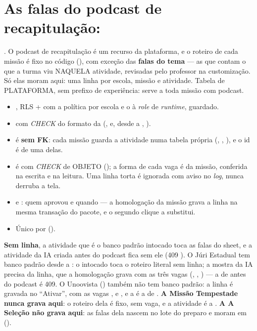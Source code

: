 \section{As falas do podcast de recapitulação: }
\label{sec:podcast-dados}

. O podcast de recapitulação é um recurso da plataforma, e o
roteiro de cada missão é fixo no código (), com
exceção das \textbf{falas do tema} --- as que contam o que a turma viu NAQUELA
atividade, revisadas pelo professor na customização. Só elas moram aqui: uma
linha por escola, missão e atividade. Tabela de PLATAFORMA, sem prefixo de
experiência: serve a toda missão com podcast.

\begin{itemize}
  \item {}, RLS  +  com a política
    por escola e o  à \emph{role} de \emph{runtime}, guardado.
  \item {} com \emph{CHECK} do formato da 
    (,  e, desde a , ).
  \item {} é  \textbf{sem FK}: cada missão guarda a
    atividade numa tabela própria (,
    , ), e o id é de uma delas.
  \item {} é  com \emph{CHECK} de OBJETO
    (); a forma de cada vaga é da missão, conferida na
    escrita e na leitura. Uma linha torta é ignorada com aviso no \emph{log},
    nunca derruba a tela.
  \item {} e : quem aprovou e quando --- a
    homologação da missão grava a linha na mesma transação do pacote, e o
    segundo clique a substitui.
  \item Único por 
    ().
\end{itemize}

\textbf{Sem linha}, a atividade que é o banco padrão intocado toca as falas do
sheet, e a atividade da IA criada antes do podcast fica sem ele (409
). O Júri Estadual tem banco padrão desde a : o intocado toca o
roteiro literal sem linha; a mostra da IA precisa da linha, que a homologação
grava com as três vagas (, , ) --- a de antes do
podcast é 409.
O Unoovista () também não tem banco padrão: a linha é gravada no
\enquote{Ativar}, com as vagas ,  e , e a
 é a de . \textbf{A Missão
Tempestade nunca grava aqui}: o roteiro dela é fixo, sem vaga, e a atividade é a
. \textbf{A A Seleção não grava aqui}: as falas dela
nascem no lote do preparo e moram em 
().

